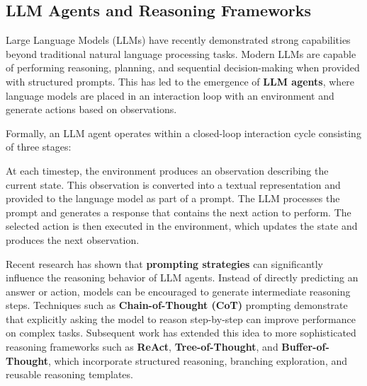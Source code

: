 \subsection{LLM Agents and Reasoning Frameworks}

Large Language Models (LLMs) have recently demonstrated strong capabilities beyond traditional natural language processing tasks. Modern LLMs are capable of performing reasoning, planning, and sequential decision-making when provided with structured prompts. This has led to the emergence of \textbf{LLM agents}, where language models are placed in an interaction loop with an environment and generate actions based on observations.

Formally, an LLM agent operates within a closed-loop interaction cycle consisting of three stages:



At each timestep, the environment produces an observation describing the current state. This observation is converted into a textual representation and provided to the language model as part of a prompt. The LLM processes the prompt and generates a response that contains the next action to perform. The selected action is then executed in the environment, which updates the state and produces the next observation.

Recent research has shown that \textbf{prompting strategies} can significantly influence the reasoning behavior of LLM agents. Instead of directly predicting an answer or action, models can be encouraged to generate intermediate reasoning steps. Techniques such as \textbf{Chain-of-Thought (CoT)} prompting demonstrate that explicitly asking the model to reason step-by-step can improve performance on complex tasks. Subsequent work has extended this idea to more sophisticated reasoning frameworks such as \textbf{ReAct}, \textbf{Tree-of-Thought}, and \textbf{Buffer-of-Thought}, which incorporate structured reasoning, branching exploration, and reusable reasoning templates.


